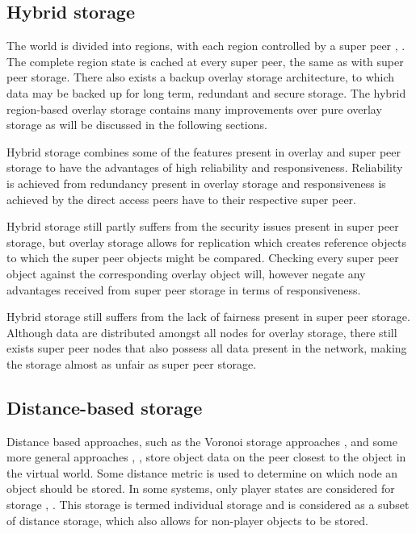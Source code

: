 \documentclass[10pt,a4paper,conference]{IEEEtran}
\begin{document}
\subsection{Hybrid storage}

The world is divided into regions, with each region controlled by a super peer \cite{zoned_federation}, \cite{hybrid_storage1}. The complete region
state is cached at every super peer, the same as with super peer storage. There also exists a backup overlay storage architecture, to which data may
be backed up for long term, redundant and secure storage. The hybrid region-based overlay storage contains many improvements over pure overlay
storage as will be discussed in the following sections.

Hybrid storage combines some of the features present in overlay and super peer storage to have the advantages of high reliability and responsiveness.
Reliability is achieved from redundancy present in overlay storage and responsiveness is achieved by the direct access peers have to their respective
super peer.

Hybrid storage still partly suffers from the security issues present in super peer storage, but overlay storage allows for replication which creates
reference objects to which the super peer objects might be compared. Checking every super peer object against the corresponding overlay object will,
however negate any advantages received from super peer storage in terms of responsiveness.

Hybrid storage still suffers from the lack of fairness present in super peer storage. Although data are distributed amongst all nodes for overlay
storage, there still exists super peer nodes that also possess all data present in the network, making the storage almost as unfair as super peer
storage.

\subsection{Distance-based storage}

Distance based approaches, such as the Voronoi storage approaches \cite{Buyukkaya_voronoi_state_management}, \cite{Hu_voronoi_IM} and some more
general approaches \cite{colyseus_distance_based}, \cite{solipsis}, store object data on the peer closest to the object in the virtual world. Some
distance metric is used to determine on which node an object should be stored. In some systems, only player states are considered for storage
\cite{individual_storage1}, \cite{cheat_proof_playout}. This storage is termed individual storage and is considered as a subset of distance storage,
which also allows for non-player objects to be stored.
\end{document}
